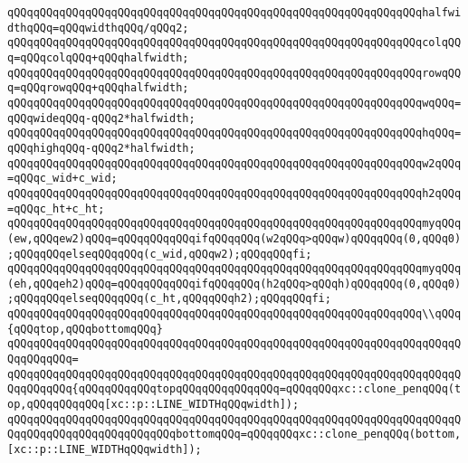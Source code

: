 \verb|qQQqqQQqqQQqqQQqqQQqqQQqqQQqqQQqqQQqqQQqqQQqqQQqqQQqqQQqqQQqqQQqhalfwidthqQQq=qQQqwidthqQQq/qQQq2;|\newline
\newline
\verb|qQQqqQQqqQQqqQQqqQQqqQQqqQQqqQQqqQQqqQQqqQQqqQQqqQQqqQQqqQQqqQQqcolqQQq=qQQqcolqQQq+qQQqhalfwidth;|\newline
\verb|qQQqqQQqqQQqqQQqqQQqqQQqqQQqqQQqqQQqqQQqqQQqqQQqqQQqqQQqqQQqqQQqrowqQQq=qQQqrowqQQq+qQQqhalfwidth;|\newline
\newline
\verb|qQQqqQQqqQQqqQQqqQQqqQQqqQQqqQQqqQQqqQQqqQQqqQQqqQQqqQQqqQQqqQQqwqQQq=qQQqwideqQQq-qQQq2*halfwidth;|\newline
\verb|qQQqqQQqqQQqqQQqqQQqqQQqqQQqqQQqqQQqqQQqqQQqqQQqqQQqqQQqqQQqqQQqhqQQq=qQQqhighqQQq-qQQq2*halfwidth;|\newline
\newline
\verb|qQQqqQQqqQQqqQQqqQQqqQQqqQQqqQQqqQQqqQQqqQQqqQQqqQQqqQQqqQQqqQQqw2qQQq=qQQqc_wid+c_wid;|\newline
\verb|qQQqqQQqqQQqqQQqqQQqqQQqqQQqqQQqqQQqqQQqqQQqqQQqqQQqqQQqqQQqqQQqh2qQQq=qQQqc_ht+c_ht;|\newline
\newline
\verb|qQQqqQQqqQQqqQQqqQQqqQQqqQQqqQQqqQQqqQQqqQQqqQQqqQQqqQQqqQQqqQQqmyqQQq(ew,qQQqew2)qQQq=qQQqqQQqqQQqifqQQqqQQq(w2qQQq>qQQqw)qQQqqQQq(0,qQQq0);qQQqqQQqelseqQQqqQQq(c_wid,qQQqw2);qQQqqQQqfi;|\newline
\verb|qQQqqQQqqQQqqQQqqQQqqQQqqQQqqQQqqQQqqQQqqQQqqQQqqQQqqQQqqQQqqQQqmyqQQq(eh,qQQqeh2)qQQq=qQQqqQQqqQQqifqQQqqQQq(h2qQQq>qQQqh)qQQqqQQq(0,qQQq0);qQQqqQQqelseqQQqqQQq(c_ht,qQQqqQQqh2);qQQqqQQqfi;|\newline
\newline
\verb|qQQqqQQqqQQqqQQqqQQqqQQqqQQqqQQqqQQqqQQqqQQqqQQqqQQqqQQqqQQqqQQq\\qQQq{qQQqtop,qQQqbottomqQQq}|\newline
\verb|qQQqqQQqqQQqqQQqqQQqqQQqqQQqqQQqqQQqqQQqqQQqqQQqqQQqqQQqqQQqqQQqqQQqqQQqqQQqqQQq=|\newline
\verb|qQQqqQQqqQQqqQQqqQQqqQQqqQQqqQQqqQQqqQQqqQQqqQQqqQQqqQQqqQQqqQQqqQQqqQQqqQQqqQQq{qQQqqQQqqQQqtopqQQqqQQqqQQqqQQq=qQQqqQQqxc::clone_penqQQq(top,qQQqqQQqqQQq[xc::p::LINE_WIDTHqQQqwidth]);|\newline
\verb|qQQqqQQqqQQqqQQqqQQqqQQqqQQqqQQqqQQqqQQqqQQqqQQqqQQqqQQqqQQqqQQqqQQqqQQqqQQqqQQqqQQqqQQqqQQqqQQqbottomqQQq=qQQqqQQqxc::clone_penqQQq(bottom,[xc::p::LINE_WIDTHqQQqwidth]);|\newline
\newline
